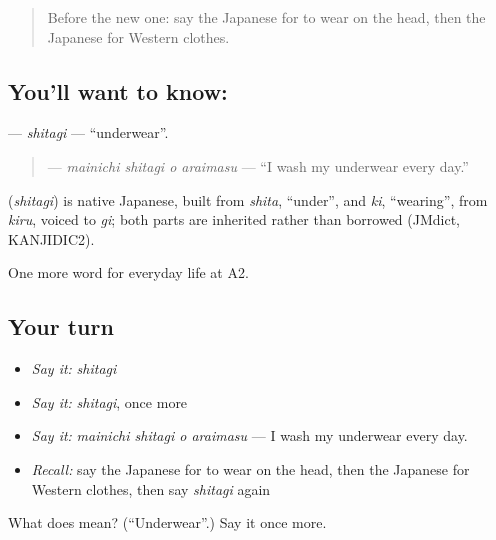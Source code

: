 \label{lesson:JA-C149-shitagi}



\begin{quote}
Before the new one: say the Japanese for to wear on the head, then the Japanese for Western clothes.
\end{quote}

\subsection*{You'll want to know: }
\textbf{} — \emph{shitagi} — \textquotedblleft{}underwear\textquotedblright{}.

\begin{quote}
\textbf{  } — \emph{mainichi shitagi o araimasu} — \textquotedblleft{}I wash my underwear every day.\textquotedblright{}
\end{quote}

\begin{cousinweb}
\textbf{} (\emph{shitagi}) is native Japanese, built from \emph{shita}, \textquotedblleft{}under\textquotedblright{}, and \emph{ki}, \textquotedblleft{}wearing\textquotedblright{}, from \emph{kiru}, voiced to \emph{gi}; both parts are inherited rather than borrowed (JMdict, KANJIDIC2).
\end{cousinweb}

\begin{grammarlens}[title={What you've built}]
One more word for everyday life at A2.
\end{grammarlens}

\subsection*{Your turn}
\begin{itemize}
\raggedright
  \item \emph{Say it:} \emph{shitagi}
  \item \emph{Say it:} \emph{shitagi}, once more
  \item \emph{Say it:} \emph{mainichi shitagi o araimasu} — I wash my underwear every day.
  \item \emph{Recall:} say the Japanese for to wear on the head, then the Japanese for Western clothes, then say \emph{shitagi} again
\end{itemize}

\begin{tcolorbox}[breakable,colback=teal!4,colframe=teal!35!black,title={Before you move on}]
What does  mean? (\textquotedblleft{}Underwear\textquotedblright{}.) Say it once more.
\end{tcolorbox}

